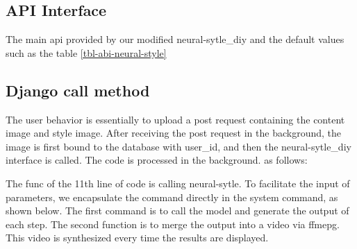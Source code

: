 \subsection{API Interface}
The main api provided by our modified neural-sytle\_diy and the default values such as the table \ref{tbl-abi-neural-style}
\subsection{Django call method}
The user behavior is essentially to upload a post request containing the content image and style image. After receiving the post request in the background, the image is first bound to the database with user\_id, and then the neural-sytle\_diy interface is called. The code is processed in the background. as follows:

The func of the 11th line of code is calling neural-sytle. To facilitate the input of parameters, we encapsulate the command directly in the system command, as shown below. The first command is to call the model and generate the output of each step. The second function is to merge the output into a video via ffmepg. This video is synthesized every time the results are displayed.
